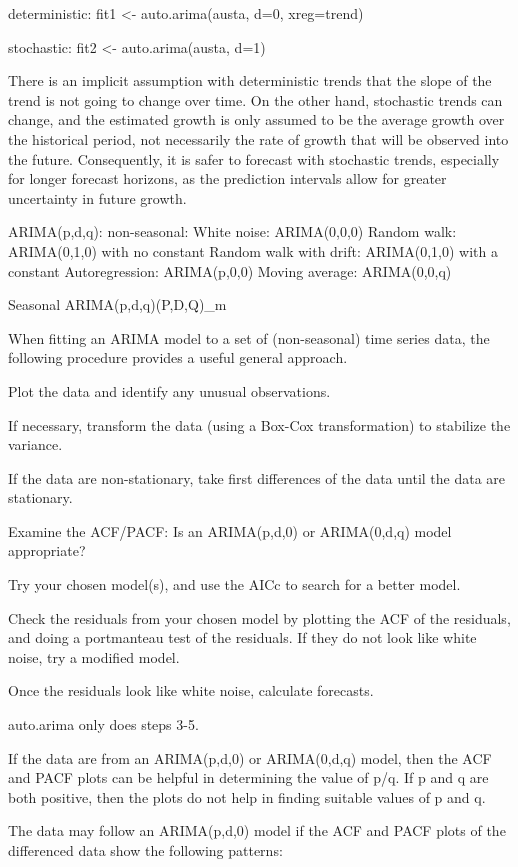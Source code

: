 \documentclass[]{book}
\begin{document}
deterministic: fit1 \textless{}- auto.arima(austa, d=0, xreg=trend)

stochastic: fit2 \textless{}- auto.arima(austa, d=1)

There is an implicit assumption with deterministic trends that the slope of the trend is not going to change over time. On the other hand, stochastic trends can change, and the estimated growth is only assumed to be the average growth over the historical period, not necessarily the rate of growth that will be observed into the future. Consequently, it is safer to forecast with stochastic trends, especially for longer forecast horizons, as the prediction intervals allow for greater uncertainty in future growth.

ARIMA(p,d,q): non-seasonal: White noise: ARIMA(0,0,0) Random walk: ARIMA(0,1,0) with no constant Random walk with drift: ARIMA(0,1,0) with a constant Autoregression: ARIMA(p,0,0) Moving average: ARIMA(0,0,q)

Seasonal ARIMA(p,d,q)(P,D,Q)\_m

When fitting an ARIMA model to a set of (non-seasonal) time series data, the following procedure provides a useful general approach.

Plot the data and identify any unusual observations.

If necessary, transform the data (using a Box-Cox transformation) to stabilize the variance.

If the data are non-stationary, take first differences of the data until the data are stationary.

Examine the ACF/PACF: Is an ARIMA(p,d,0) or ARIMA(0,d,q) model appropriate?

Try your chosen model(s), and use the AICc to search for a better model.

Check the residuals from your chosen model by plotting the ACF of the residuals, and doing a portmanteau test of the residuals. If they do not look like white noise, try a modified model.

Once the residuals look like white noise, calculate forecasts.

auto.arima only does steps 3-5.

If the data are from an ARIMA(p,d,0) or ARIMA(0,d,q) model, then the ACF and PACF plots can be helpful in determining the value of p/q. If p and q are both positive, then the plots do not help in finding suitable values of p and q.

The data may follow an ARIMA(p,d,0) model if the ACF and PACF plots of the differenced data show the following patterns:
\end{document}
